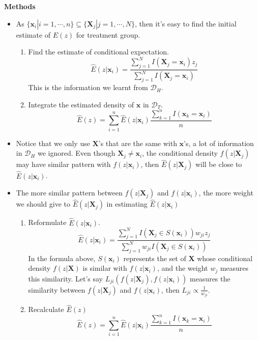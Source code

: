 \documentclass{article}
\begin{document}
\textbf{Methods}
\begin{itemize}
\item As $\{\mathbf{x}_{i}|i=1,\cdots, n\}\subseteq\{\mathbf{X}_{j}|j=1,\cdots, N\}$, then it's easy to find the initial estimate of $E(z)$ for treatment group. 
\begin{enumerate}
\item Find the estimate of conditional expectation.\\
$$\hat{E}(z|\mathbf{x}_{i})=\frac{\sum^{N}_{j=1}I(\mathbf{X}_{j}=\mathbf{x}_{i})z_{j}}{\sum^{N}_{j=1}I(\mathbf{X}_{j}=\mathbf{x}_{i})}$$
This is the information we learnt from $\mathscr{D}_{H}$.
\item Integrate the estimated density of $\mathbf{x}$ in $\mathscr{D}_{T}$.
$$\hat{E}(z)=\sum^{n}_{i=1}\hat{E}(z|\mathbf{x}_{i})\frac{\sum^{n}_{k=1}I(\mathbf{x}_{k}=\mathbf{x}_{i})}{n}$$
\end{enumerate}

\item Notice that we only use $\mathbf{X}$'s that are the same with $\mathbf{x}$'s, a lot of information in $\mathscr{D}_{H}$ we ignored. Even though $\mathbf{X}_{j}\neq \mathbf{x}_{i}$, the conditional density $f(z|\mathbf{X}_{j})$ may have similar pattern with $f(z|\mathbf{x}_{i})$, then $\hat{E}(z|\mathbf{X}_{j})$ will be close to $\hat{E}(z|\mathbf{x}_{i})$.
\item The more similar pattern between $f(z|\mathbf{X}_{j})$ and $f(z|\mathbf{x}_{i})$, the more weight we should give to $\hat{E}(z|\mathbf{X}_{j})$ in estimating $\hat{E}(z|\mathbf{x}_{i})$
\begin{enumerate}
\item Reformulate $\hat{E}(z|\mathbf{x}_{i})$.
$$\hat{E}(z|\mathbf{x}_{i})=\frac{\sum^{N}_{j=1}I(\mathbf{X}_{j}\in S(\mathbf{x}_{i}))w_{ji}z_{j}}{\sum^{N}_{j=1}w_{ji}I(\mathbf{X}_{j}\in S(\mathbf{x}_{i}))}$$
In the formula above, $S(\mathbf{x}_{i})$ represents the set of $\mathbf{X}$ whose conditional density $f(z|\mathbf{X})$ is similar with $f(z|\mathbf{x}_{i})$, and the weight $w_{j}$ measures this similarity. Let's say $L_{ji}(f(z|\mathbf{X}_{j}), f(z|\mathbf{x}_{i}))$ measures the similarity between $f(z|\mathbf{X}_{j})$ and  $f(z|\mathbf{x}_{i})$, then $L_{ji}\varpropto\frac{1}{w_{ji}}$.
\item Recalculate $\hat{E}(z)$
$$\hat{E}(z)=\sum^{n}_{i=1}\hat{E}(z|\mathbf{x}_{i})\frac{\sum^{n}_{k=1}I(\mathbf{x}_{k}=\mathbf{x}_{i})}{n}$$
\end{enumerate}


\end{itemize}
\end{document}
